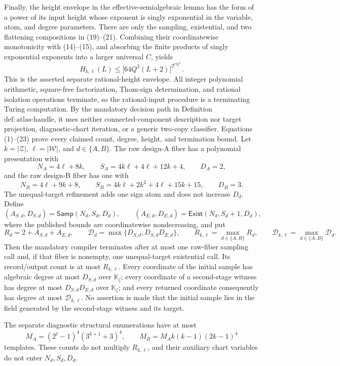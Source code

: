 Finally, the height envelope in the effective-semialgebraic lemma has the form of a power of its input height whose exponent is singly exponential in the variable, atom, and degree parameters.  There are only the sampling, existential, and two flattening compositions in (19)--(21).  Combining their coordinatewise monotonicity with (14)--(15), and absorbing the finite products of singly exponential exponents into a larger universal \(C\), yields
\[
H_{k,\ell}(L)
\le \bigl[64Q^2(L+2)\bigr]^{2^{CQ^C}}.                   \tag{23}
\]
This is the asserted separate rational-height envelope.  All integer polynomial arithmetic, square-free factorization, Thom-sign determination, and rational isolation operations terminate, so the rational-input procedure is a terminating Turing computation.  By the mandatory decision path in Definition \(\mathrm{def{:}atlas\text{-}handle}\), it uses neither connected-component description nor target projection, diagnostic-chart iteration, or a generic two-copy classifier.  Equations (1)--(23) prove every claimed count, degree, height, and termination bound.
Let \(k=|\mathcal Z|\), \(\ell=|\mathcal W|\), and \(d\in\{A,B\}\).  The raw design-A fiber has a polynomial presentation with
\[
 N_A=4\ell+8k,\qquad
 S_A=4k\ell+4\ell+12k+4,\qquad
 D_A=2,
\]
and the raw design-B fiber has one with
\[
 N_B=4\ell+9k+8,\qquad
 S_B=4k\ell+2k^2+4\ell+15k+15,\qquad
 D_B=3.
\]
The unequal-target refinement adds one sign atom and does not increase \(D_d\).  Define
\[
 (A_{S,d},D_{S,d})=\mathsf{Samp}(N_d,S_d,D_d),
 \qquad
 (A_{E,d},D_{E,d})=\mathsf{Exist}(N_d,S_d+1,D_d),
\]
where the published bounds are coordinatewise nondecreasing, and put
\[
 R_d=2+A_{S,d}+A_{E,d},
 \qquad
 \mathcal D_d=\max\{D_{S,d},D_{S,d}D_{E,d}\},
 \qquad
 R_{k,\ell}=\max_{d\in\{A,B\}}R_d,
 \qquad
 \mathcal D_{k,\ell}=\max_{d\in\{A,B\}}\mathcal D_d.
\]
Then the mandatory compiler terminates after at most one raw-fiber sampling call and, if that fiber is nonempty, one unequal-target existential call.  Its record/output count is at most \(R_{k,\ell}\).  Every coordinate of the initial sample has algebraic degree at most \(D_{S,d}\) over \(\mathbb K_{\zeta}\); every coordinate of a second-stage witness has degree at most \(D_{S,d}D_{E,d}\) over \(\mathbb K_{\zeta}\); and every returned coordinate consequently has degree at most \(\mathcal D_{k,\ell}\).  No assertion is made that the initial sample lies in the field generated by the second-stage witness and its target.

The separate diagnostic structural enumerations have at most
\[
 M_A=(2^{\ell}-1)^4(3^{k+1}+3)^4,
 \qquad
 M_B=M_Ak(k-1)(2k-1)^4
\]
templates.  These counts do not multiply \(R_{k,\ell}\), and their auxiliary chart variables do not enter \(N_d,S_d,D_d\).

